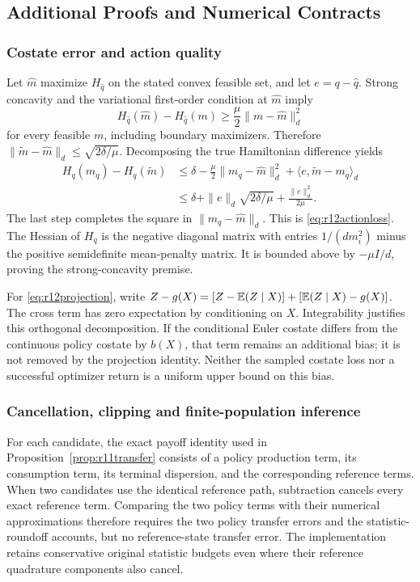 \subsection{Additional Proofs and Numerical Contracts}\label{app:r12proofs}
\subsubsection{Costate error and action quality}
Let $\widehat m$ maximize $H_{\widehat q}$ on the stated convex feasible set, and let $e=q-\widehat q$. Strong concavity and the variational first-order condition at $\widehat m$ imply
\[
 H_{\widehat q}(\widehat m)-H_{\widehat q}(m)
       \geq \frac\mu2\|m-\widehat m\|_d^2
\]
for every feasible $m$, including boundary maximizers. Therefore
$\|\widetilde m-\widehat m\|_d\leq\sqrt{2\delta/\mu}$. Decomposing the true Hamiltonian difference yields
\begin{align*}
 H_q(m_q)-H_q(\widetilde m)
 &\leq \delta-\frac\mu2\|m_q-\widehat m\|_d^2
           +\langle e,\widetilde m-m_q\rangle_d\\
 &\leq \delta+\|e\|_d\sqrt{2\delta/\mu}+\frac{\|e\|_d^2}{2\mu}.
\end{align*}
The last step completes the square in $\|m_q-\widehat m\|_d$. This is \eqref{eq:r12actionloss}. The Hessian of $H_q$ is the negative diagonal matrix with entries $1/(dm_i^2)$ minus the positive semidefinite mean-penalty matrix. It is bounded above by $-\mu I/d$, proving the strong-concavity premise.

For \eqref{eq:r12projection}, write $Z-g(X)=[Z-\mathbb E(Z\mid X)]+[\mathbb E(Z\mid X)-g(X)]$. The cross term has zero expectation by conditioning on $X$. Integrability justifies this orthogonal decomposition. If the conditional Euler costate differs from the continuous policy costate by $b(X)$, that term remains an additional bias; it is not removed by the projection identity. Neither the sampled costate loss nor a successful optimizer return is a uniform upper bound on this bias.

\subsubsection{Cancellation, clipping and finite-population inference}
For each candidate, the exact payoff identity used in Proposition~\ref{prop:r11transfer} consists of a policy production term, its consumption term, its terminal dispersion, and the corresponding reference terms. When two candidates use the identical reference path, subtraction cancels every exact reference term. Comparing the two policy terms with their numerical approximations therefore requires the two policy transfer errors and the statistic-roundoff accounts, but no reference-state transfer error. The implementation retains conservative original statistic budgets even where their reference quadrature components also cancel.

